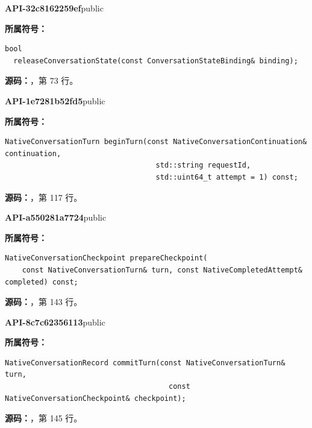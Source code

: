 \textbf{API-32c8162259ef}\quad public\par
\textbf{所属符号：}\par
\begin{Verbatim}[fontsize=\footnotesize,breaklines,breakanywhere]
bool
  releaseConversationState(const ConversationStateBinding& binding);
\end{Verbatim}
\textbf{源码：}，第 73 行。\par

\textbf{API-1e7281b52fd5}\quad public\par
\textbf{所属符号：}\par
\begin{Verbatim}[fontsize=\footnotesize,breaklines,breakanywhere]
NativeConversationTurn beginTurn(const NativeConversationContinuation& continuation,
                                   std::string requestId,
                                   std::uint64_t attempt = 1) const;
\end{Verbatim}
\textbf{源码：}，第 117 行。\par

\textbf{API-a550281a7724}\quad public\par
\textbf{所属符号：}\par
\begin{Verbatim}[fontsize=\footnotesize,breaklines,breakanywhere]
NativeConversationCheckpoint prepareCheckpoint(
    const NativeConversationTurn& turn, const NativeCompletedAttempt& completed) const;
\end{Verbatim}
\textbf{源码：}，第 143 行。\par

\textbf{API-8c7c62356113}\quad public\par
\textbf{所属符号：}\par
\begin{Verbatim}[fontsize=\footnotesize,breaklines,breakanywhere]
NativeConversationRecord commitTurn(const NativeConversationTurn& turn,
                                      const NativeConversationCheckpoint& checkpoint);
\end{Verbatim}
\textbf{源码：}，第 145 行。\par

